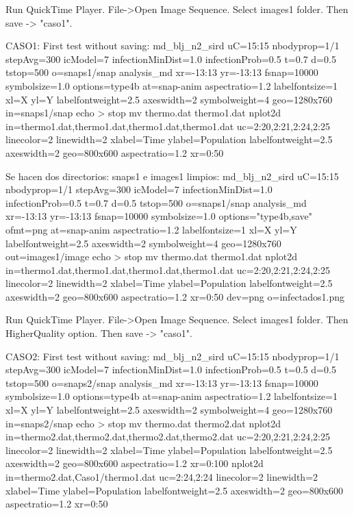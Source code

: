Run QuickTime Player.  File->Open Image Sequence. Select images1 folder. Then save -> "caso1".


CASO1:
First test without saving:
md_blj_n2_sird uC=15:15 nbodyprop=1/1 stepAvg=300 icModel=7 infectionMinDist=1.0 infectionProb=0.5 t=0.7 d=0.5 tstop=500  o=snaps1/snap%
analysis_md xr=-13:13 yr=-13:13 fsnap=10000 symbolsize=1.0 options=type4b at=snap-anim  aspectratio=1.2 labelfontsize=1 xl=X yl=Y labelfontweight=2.5 axeswidth=2 symbolweight=4 geo=1280x760 in=snaps1/snap%
echo > stop
mv thermo.dat thermo1.dat
nplot2d in=thermo1.dat,thermo1.dat,thermo1.dat,thermo1.dat uc=2:20,2:21,2:24,2:25 linecolor=2 linewidth=2 xlabel=Time ylabel=Population labelfontweight=2.5 axeswidth=2 geo=800x600 aspectratio=1.2 xr=0:50

Se hacen dos directorios: snaps1 e images1 limpios:
md_blj_n2_sird uC=15:15 nbodyprop=1/1 stepAvg=300 icModel=7 infectionMinDist=1.0 infectionProb=0.5 t=0.7 d=0.5 tstop=500 o=snaps1/snap%
analysis_md xr=-13:13 yr=-13:13 fsnap=10000 symbolsize=1.0 options="type4b,save" ofmt=png at=snap-anim  aspectratio=1.2 labelfontsize=1 xl=X yl=Y labelfontweight=2.5 axeswidth=2 symbolweight=4 geo=1280x760 out=images1/image%
echo > stop
mv thermo.dat thermo1.dat
nplot2d in=thermo1.dat,thermo1.dat,thermo1.dat,thermo1.dat uc=2:20,2:21,2:24,2:25 linecolor=2 linewidth=2 xlabel=Time ylabel=Population labelfontweight=2.5 axeswidth=2 geo=800x600 aspectratio=1.2 xr=0:50 dev=png o=infectados1.png

Run QuickTime Player.  File->Open Image Sequence. Select images1 folder. Then HigherQuality option. Then save -> "caso1".

CASO2:
First test without saving:
md_blj_n2_sird uC=15:15 nbodyprop=1/1 stepAvg=300 icModel=7 infectionMinDist=1.0 infectionProb=0.5 t=0.5 d=0.5 tstop=500  o=snaps2/snap%
analysis_md xr=-13:13 yr=-13:13 fsnap=10000 symbolsize=1.0 options=type4b at=snap-anim  aspectratio=1.2 labelfontsize=1 xl=X yl=Y labelfontweight=2.5 axeswidth=2 symbolweight=4 geo=1280x760 in=snaps2/snap%
echo > stop
mv thermo.dat thermo2.dat
nplot2d in=thermo2.dat,thermo2.dat,thermo2.dat,thermo2.dat uc=2:20,2:21,2:24,2:25 linecolor=2 linewidth=2 xlabel=Time ylabel=Population labelfontweight=2.5 axeswidth=2 geo=800x600 aspectratio=1.2 xr=0:100
nplot2d in=thermo2.dat,Caso1/thermo1.dat uc=2:24,2:24 linecolor=2 linewidth=2 xlabel=Time ylabel=Population labelfontweight=2.5 axeswidth=2 geo=800x600 aspectratio=1.2 xr=0:50

